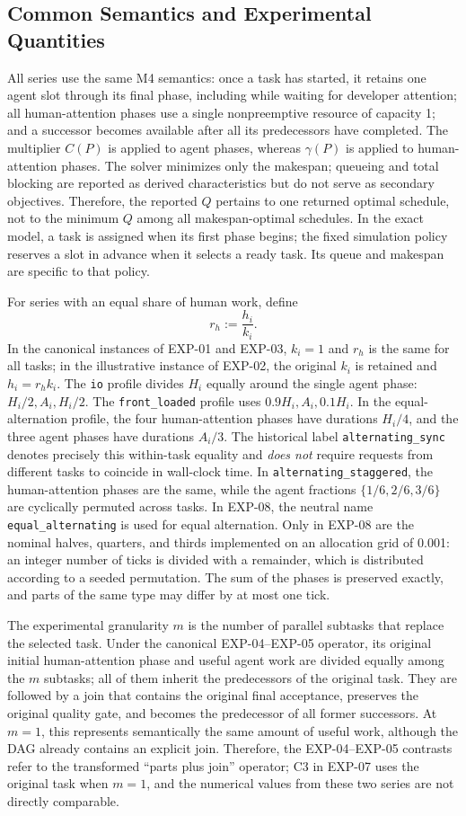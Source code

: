 \subsection{Common Semantics and Experimental Quantities}

All series use the same M4 semantics: once a task has started, it retains one
agent slot through its final phase, including while waiting for developer
attention; all human-attention phases use a single nonpreemptive resource of
capacity 1; and a successor becomes available after all its predecessors have
completed. The multiplier $C(P)$ is applied to agent phases, whereas $\gamma(P)$
is applied to human-attention phases. The solver minimizes only the makespan;
queueing and total blocking are reported as derived characteristics but do not
serve as secondary objectives. Therefore, the reported $Q$ pertains to one
returned optimal schedule, not to the minimum $Q$ among all makespan-optimal
schedules. In the exact model, a task is assigned when its first phase begins;
the fixed simulation policy reserves a slot in advance when it selects a ready
task. Its queue and makespan are specific to that policy.

For series with an equal share of human work, define
\[
  r_h:=\frac{h_i}{k_i}.
\]
In the canonical instances of EXP-01 and EXP-03, $k_i=1$ and $r_h$ is the same
for all tasks; in the illustrative instance of EXP-02, the original $k_i$ is
retained and $h_i=r_hk_i$. The \texttt{io} profile divides $H_i$ equally around
the single agent phase: $H_i/2,A_i,H_i/2$. The \texttt{front\_loaded} profile uses
$0.9H_i,A_i,0.1H_i$. In the equal-alternation profile, the four human-attention
phases have durations $H_i/4$, and the three agent phases have durations $A_i/3$.
The historical label \texttt{alternating\_sync} denotes precisely this within-task
equality and \emph{does not} require requests from different tasks to coincide in
wall-clock time. In \texttt{alternating\_staggered}, the human-attention phases are
the same, while the agent fractions $\{1/6,2/6,3/6\}$ are cyclically permuted
across tasks. In EXP-08, the neutral name \texttt{equal\_alternating} is used for
equal alternation. Only in EXP-08 are the nominal halves, quarters, and thirds
implemented on an allocation grid of 0.001: an integer number of ticks is divided
with a remainder, which is distributed according to a seeded permutation. The
sum of the phases is preserved exactly, and parts of the same type may differ by
at most one tick.

The experimental granularity $m$ is the number of parallel subtasks that replace
the selected task. Under the canonical EXP-04--EXP-05 operator, its original
initial human-attention phase and useful agent work are divided equally among the
$m$ subtasks; all of them inherit the predecessors of the original task. They are
followed by a join that contains the original final acceptance, preserves the
original quality gate, and becomes the predecessor of all former successors. At
$m=1$, this represents semantically the same amount of useful work, although the
DAG already contains an explicit join. Therefore, the EXP-04--EXP-05 contrasts
refer to the transformed ``parts plus join'' operator; C3 in EXP-07 uses the
original task when $m=1$, and the numerical values from these two series are not
directly comparable.
